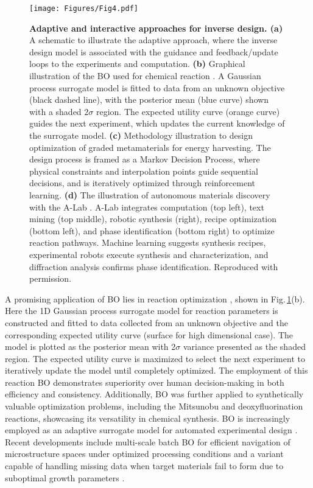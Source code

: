 \documentclass[fleqn,10pt]{wlscirep}
\begin{document}
\begin{figure}[!htbp]
    \centering
    \texttt{[image: Figures/Fig4.pdf]}
    \caption{
    \textbf{Adaptive and interactive approaches for inverse design. (a)} A schematic to illustrate the adaptive approach, where the inverse design model is associated with the guidance and feedback/update loops to the experiments and computation. \textbf{(b)} Graphical illustration of the BO used for chemical reaction \cite{shields2021bayesian}. A Gaussian process surrogate model is fitted to data from an unknown objective (black dashed line), with the posterior mean (blue curve) shown with a shaded $2\sigma$ region. The expected utility curve (orange curve) guides the next experiment, which updates the current knowledge of the surrogate model. \textbf{(c)} Methodology illustration to design optimization of graded metamaterials for energy harvesting\cite{rosafalco2023reinforcement}. The design process is framed as a Markov Decision Process, where physical constraints and interpolation points guide sequential decisions, and is iteratively optimized through reinforcement learning. \textbf{(d)} The illustration of autonomous materials discovery with the A-Lab \cite{szymanski2023autonomous}. A-Lab integrates computation (top left), text mining (top middle), robotic synthesis (right), recipe optimization (bottom left), and phase identification (bottom right) to optimize reaction pathways. Machine learning suggests synthesis recipes, experimental robots execute synthesis and characterization, and diffraction analysis confirms phase identification. Reproduced with permission\cite{shields2021bayesian,rosafalco2023reinforcement,szymanski2023autonomous}. }
    \label{fig4}
\end{figure}

A promising application of BO lies in reaction optimization \cite{shields2021bayesian}, shown in Fig.\,\ref{fig4}(b). Here the 1D Gaussian process surrogate model for reaction parameters is constructed and fitted to data collected from an unknown objective and the corresponding expected utility curve (surface for high dimensional case). The model is plotted as the posterior mean with 2$\sigma$ variance presented as the shaded region. The expected utility curve is maximized to select the next experiment to iteratively update the model until completely optimized. The employment of this reaction BO demonstrates superiority over human decision-making in both efficiency and consistency. Additionally, BO was further applied to synthetically valuable optimization problems, including the Mitsunobu and deoxyfluorination reactions, showcasing its versatility in chemical synthesis. BO is increasingly employed as an adaptive surrogate model for automated experimental design \cite{lei2021bayesian}. Recent developments include multi-scale batch BO for efficient navigation of microstructure spaces under optimized processing conditions \cite{honarmandi2022accelerated} and a variant capable of handling missing data when target materials fail to form due to suboptimal growth parameters \cite{wakabayashi2022bayesian}.
\end{document}

